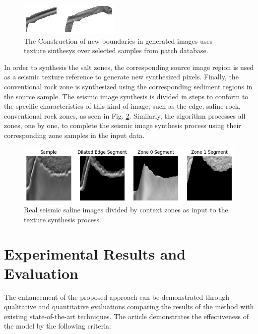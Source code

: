 \documentclass{ieeeaccess}
\begin{document}
\begin{figure}
        \centering
        \includegraphics[width=1\linewidth]{images/edge3.jpg}
        \caption{The Construction of new boundaries in generated images uses  texture sinthesys over selected samples from patch database.}
        \label{fig:edge2}
    \end{figure}    

In order to synthesis the salt zones, the corresponding source image region is used as a seismic texture reference to generate new synthesized pixels. Finally, the conventional rock zone is synthesized using the corresponding sediment regions in the source sample. The seismic image synthesis is divided in steps to conform to the specific characteristics of this kind of image, such as the edge, saline rock, conventional rock zones, as seen in Fig. \ref{fig:source1}. Similarly, the algorithm processes all zones, one by one, to complete the seismic image synthesis process using their corresponding zone samples in the input data.

\begin{figure}
    \centering
    \includegraphics[width=1\linewidth]{images/2.png}
    \caption{Real seismic saline images divided by context zones as input to the texture synthesis process.}
    \label{fig:source1}
\end{figure}


\section{Experimental Results and Evaluation}

The enhancement of the proposed approach can be demonstrated through qualitative and quantitative evaluations comparing the results of the method with existing state-of-the-art techniques. The article demonstrates the effectiveness of the model by the following criteria:
\end{document}

